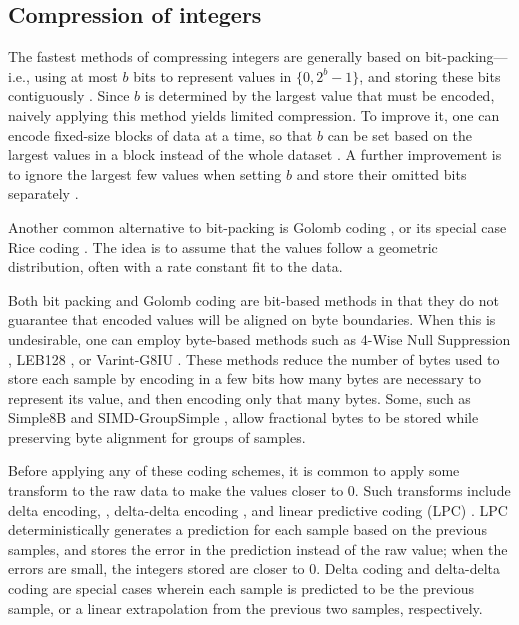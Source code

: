 \subsection{Compression of integers}


The fastest methods of compressing integers are generally based on bit-packing---i.e., using at most $b$ bits to represent values in $\{0, 2^b-1\}$, and storing these bits contiguously \cite{bbp, pfor, fastpfor}. Since $b$ is determined by the largest value that must be encoded, naively applying this method yields limited compression. To improve it, one can encode fixed-size blocks of data at a time, so that $b$ can be set based on the largest values in a block instead of the whole dataset \cite{kGamma, pfor, fastpfor}. A further improvement is to ignore the largest few values when setting $b$ and store their omitted bits separately \cite{pfor, fastpfor}.

Another common \cite{flac, shorten} alternative to bit-packing is Golomb coding \cite{golomb}, or its special case Rice coding \cite{rice}. The idea is to assume that the values follow a geometric distribution, often with a rate constant fit to the data. %

Both bit packing and Golomb coding are bit-based methods in that they do not guarantee that encoded values will be aligned on byte boundaries. When this is undesirable, one can employ byte-based methods such as 4-Wise Null Suppression \cite{kGamma}, LEB128 \cite{dwarf}, or Varint-G8IU \cite{varintG8IU}. These methods reduce the number of bytes used to store each sample by encoding in a few bits how many bytes are necessary to represent its value, and then encoding only that many bytes. Some, such as Simple8B \cite{simple8b} and SIMD-GroupSimple \cite{groupSimd}, allow fractional bytes to be stored while preserving byte alignment for groups of samples. %

Before applying any of these coding schemes, it is common to apply some transform to the raw data to make the values closer to 0. Such transforms include delta encoding, \cite{fastpfor, bbp}, delta-delta encoding \cite{influxDB}, and linear predictive coding (LPC) \cite{flac}. LPC deterministically generates a prediction for each sample based on the previous samples, and stores the error in the prediction instead of the raw value; when the errors are small, the integers stored are closer to 0. Delta coding and delta-delta coding are special cases wherein each sample is predicted to be the previous sample, or a linear extrapolation from the previous two samples, respectively.


